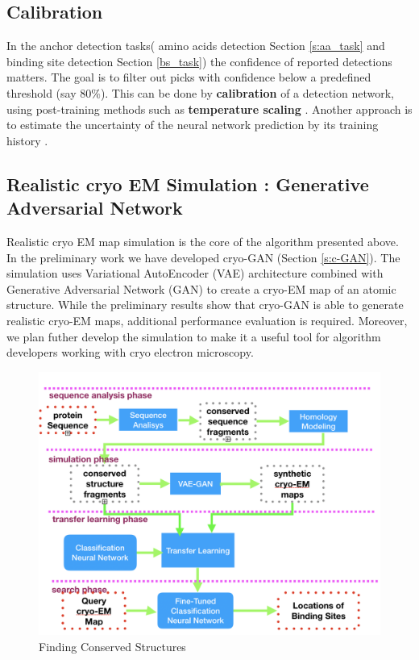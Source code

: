 \subsection{Calibration}
 In the anchor detection tasks( amino acids detection  Section \ref{s:aa_task} and binding site detection Section \ref{bs_task}) the confidence of reported detections matters.
 The goal is to filter out picks with confidence below a predefined threshold (say $80 \%$).
 This can be done by \textbf{calibration} of a detection network, using post-training methods such as \textbf{temperature scaling} \cite{Guo2017}.
 Another approach is to estimate the uncertainty of the neural network prediction by its training history \cite{Geifman2018}.
 
\subsection{Realistic cryo EM  Simulation : Generative Adversarial Network}\label{s:fut_gan}
Realistic cryo EM map simulation is the core of the algorithm presented above.
In the preliminary work we have developed cryo-GAN (Section \ref{s:c-GAN}).
The simulation uses Variational AutoEncoder (VAE) architecture combined with Generative Adversarial Network (GAN) to create  a cryo-EM map of an atomic structure.
While the preliminary results show that cryo-GAN is able to generate realistic cryo-EM maps, additional performance evaluation is required.
Moreover, we plan futher develop the simulation to make it a useful tool for algorithm developers working with cryo electron microscopy.


\begin{figure}
  \centering
	\includegraphics[scale=0.4]{picsnew/sch4.png}
  \caption{Finding Conserved Structures}\label{f:det_scheme4}
\end{figure}
